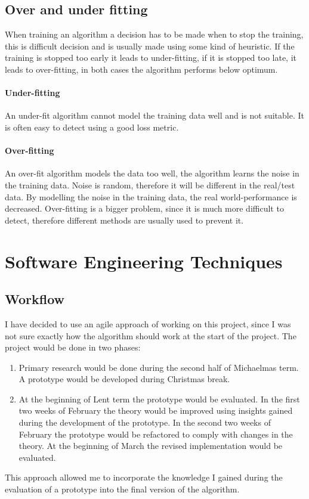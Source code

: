 \documentclass[12pt,a4paper]{book}
\begin{document}
\subsection{Over and under fitting}
When training an algorithm a decision has to be made when to stop the training, this is difficult decision and is usually made using some kind of heuristic.
If the training is stopped too early it leads to under-fitting, if it is stopped too late, it leads to over-fitting, in both cases the algorithm performs below optimum.
\paragraph{Under-fitting}
An under-fit algorithm cannot model the training data well and is not suitable.
It is often easy to detect using a good loss metric.
\paragraph{Over-fitting}
An over-fit algorithm models the data too well, the algorithm learns the noise in the training data.
Noise is random, therefore it will be different in the real/test data.
By modelling the noise in the training data, the real world-performance is decreased.
Over-fitting is a bigger problem, since it is much more difficult to detect, therefore different methods are usually used to prevent it.
\section{Software Engineering Techniques}
\subsection{Workflow}
I have decided to use an agile approach of working on this project, since I was not sure exactly how the algorithm should work at the start of the project.
The project would be done in two phases:
\begin{enumerate}
\item Primary research would be done during the second half of Michaelmas term.
A prototype would be developed during Christmas break.
\item At the beginning of Lent term the prototype would be evaluated.
In the first two weeks of February the theory would be improved using insights gained during the development of the prototype.
In the second two weeks of February the prototype would be refactored to comply with changes in the theory.
At the beginning of March the revised implementation would be evaluated.
\end{enumerate}
This approach allowed me to incorporate the knowledge I gained during the evaluation of a prototype into the final version of the algorithm.
\end{document}
